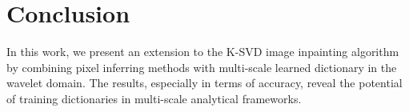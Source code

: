 \documentclass[conference]{IEEEtran}
\begin{document}
\section{Conclusion}\label{conclusion}
In this work, we present an extension to the K-SVD image inpainting algorithm by combining pixel inferring methods with multi-scale learned dictionary in the wavelet domain. The results, especially in terms of accuracy, reveal the potential of training dictionaries in multi-scale analytical frameworks.




\end{document}
